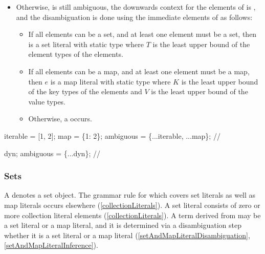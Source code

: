 \documentclass[makeidx]{article}
\begin{document}
{\begin{itemize}
  The static type of  is then .
\item
  Otherwise,  is still ambiguous,
  the downwards context for the elements of 
  is \FreeContext,
  and the disambiguation is done using
  the immediate elements of  as follows:

  \begin{itemize}
  \item
    If all elements can be a set,
    and at least one element must be a set,
    then  is a set literal with
    static type  where $T$ is
    the least upper bound of the element types of the elements.
  \item
    If all elements can be a map,
    and at least one element must be a map, then $e$ is
    a map literal with static type  where $K$ is
    the least upper bound of the key types of the elements and $V$ is
    the least upper bound of the value types.
  \item
    Otherwise, a  occurs.
  \end{itemize}
\end{itemize}


\begin{dartCode}
\VAR{} iterable = [1, 2];
\VAR{} map = \{1: 2\};
\VAR{} ambiguous = \{...iterable, ...map\}; // 
\end{dartCode}


\begin{dartCode}
\DYNAMIC{} dyn;
\VAR{} ambiguous = \{...dyn\}; // 
\end{dartCode}


\subsubsection{Sets}

\LMHash{}%
A  denotes a set object.
The grammar rule for  which covers
set literals as well as map literals occurs elsewhere
(\ref{collectionLiterals}).
A set literal consists of zero or more collection literal elements
(\ref{collectionLiterals}).
A term derived from 
may be a set literal or a map literal,
and it is determined via a disambiguation step
whether it is a set literal or a map literal
(\ref{setAndMapLiteralDisambiguation}, \ref{setAndMapLiteralInference}).

}
\end{document}
